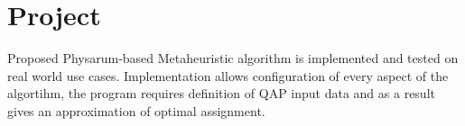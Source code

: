 \chapter{Project}
\label{chapter:project}

Proposed Physarum-based Metaheuristic algorithm is implemented and tested on real world use cases. Implementation allows configuration of every aspect of the algortihm, the program requires definition of QAP input data and as a result gives an approximation of optimal assignment.





